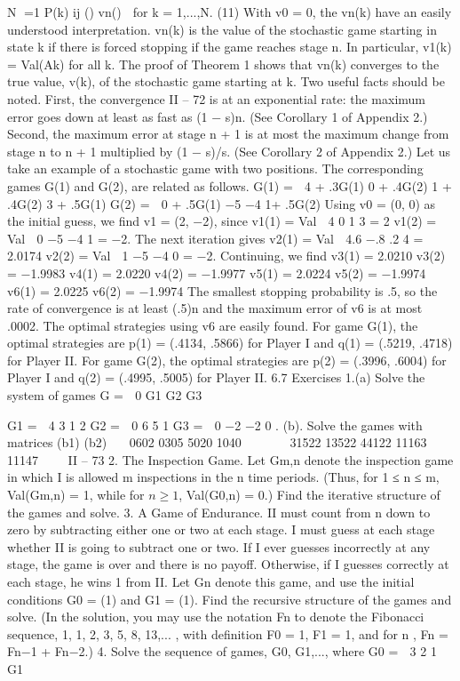 \documentclass[]{report}
\begin{document}
N
=1
P(k)
ij () vn()

for k = 1,...,N. (11)
With v0 = 0, the vn(k) have an easily understood interpretation. vn(k) is the value of the
stochastic game starting in state k if there is forced stopping if the game reaches stage n.
In particular, v1(k) = Val(Ak) for all k.
The proof of Theorem 1 shows that vn(k) converges to the true value, v(k), of the
stochastic game starting at k. Two useful facts should be noted. First, the convergence
II – 72
is at an exponential rate: the maximum error goes down at least as fast as (1 − s)n.
(See Corollary 1 of Appendix 2.) Second, the maximum error at stage n + 1 is at most
the maximum change from stage n to n + 1 multiplied by (1 − s)/s. (See Corollary 2 of
Appendix 2.)
Let us take an example of a stochastic game with two positions. The corresponding
games G(1) and G(2), are related as follows.
G(1) =
 4 + .3G(1) 0 + .4G(2)
1 + .4G(2) 3 + .5G(1)
G(2) =
 0 + .5G(1) −5
−4 1+ .5G(2)
Using v0 = (0, 0) as the initial guess, we find v1 = (2, −2), since
v1(1) = Val  4 0
1 3
= 2 v1(2) = Val  0 −5
−4 1
= −2.
The next iteration gives
v2(1) = Val  4.6 −.8
.2 4
= 2.0174 v2(2) = Val  1 −5
−4 0
= −2.
Continuing, we find
v3(1) = 2.0210 v3(2) = −1.9983
v4(1) = 2.0220 v4(2) = −1.9977
v5(1) = 2.0224 v5(2) = −1.9974
v6(1) = 2.0225 v6(2) = −1.9974
The smallest stopping probability is .5, so the rate of convergence is at least (.5)n and the
maximum error of v6 is at most .0002.
The optimal strategies using v6 are easily found. For game G(1), the optimal strategies
are p(1) = (.4134, .5866) for Player I and q(1) = (.5219, .4718) for Player II. For game G(2),
the optimal strategies are p(2) = (.3996, .6004) for Player I and q(2) = (.4995, .5005) for
Player II.
6.7 Exercises
1.(a) Solve the system of games
G =
 0 G1
G2 G3

G1 =
 4 3
1 2
G2 =
 0 6
5 1
G3 =
 0 −2
−2 0
.
(b). Solve the games with matrices
(b1) (b2)
⎛
⎜⎝
0602
0305
5020
1040
⎞
⎟⎠
⎛
⎜⎜⎜⎝
31522
13522
44122
11163
11147
⎞
⎟⎟⎟⎠
II – 73
2. The Inspection Game. Let Gm,n denote the inspection game in which I is
allowed m inspections in the n time periods. (Thus, for 1 ≤ n ≤ m, Val(Gm,n) = 1, while
for $n \geq 1$, Val(G0,n) = 0.) Find the iterative structure of the games and solve.
3. A Game of Endurance. II must count from n down to zero by subtracting
either one or two at each stage. I must guess at each stage whether II is going to subtract
one or two. If I ever guesses incorrectly at any stage, the game is over and there is no
payoff. Otherwise, if I guesses correctly at each stage, he wins 1 from II. Let Gn denote
this game, and use the initial conditions G0 = (1) and G1 = (1). Find the recursive
structure of the games and solve. (In the solution, you may use the notation Fn to denote
the Fibonacci sequence, 1, 1, 2, 3, 5, 8, 13,... , with definition F0 = 1, F1 = 1, and for
n , Fn = Fn−1 + Fn−2.)
4. Solve the sequence of games, G0, G1,..., where
G0 =
 3 2
1 G1
\end{document}
